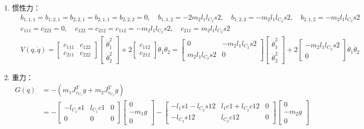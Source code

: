 \documentclass[
12pt, %
a4paper, 
oneside, %
]{scrartcl}
\begin{document}
{\begin{enumerate}
\begin{align*}
&= \begin{bmatrix} m_1l_{C_1}^2 + I_{zz1} + m_2(l_1^2 + l_{C_2}^2 + 2l_1 l_{C_2}c_2) + I_{zz2} & m_2(l_{C_2}^2 + l_1 l_{C_2}c2) + I_{zz2} \\ m_2(l_{C_2}^2 + l_1 l_{C_2}c2) + I_{zz2} & m_2 l_{C_2}^2 + I_{zz2} \end{bmatrix}
\end{align*}
\item 惯性力：
\begin{align*}
&b_{1,1,1} = b_{1,2,1} = b_{2,2,1} = b_{2,1,1} = b_{2,2,2} = 0, \quad b_{1,1,2} = -2m_2 l_1 l_{C_2}s2, \quad b_{1,2,2} = -m_2 l_1 l_{C_2}s2, \quad b_{2,1,2} = -m_2 l_1 l_{C_2}s2 \\
&c_{111} = c_{222} = 0, \quad c_{122} = c_{212} = c_{112} = -m_2 l_1 l_{C_2}s2, \quad c_{211} = m_2 l_1 l_{C_2}s2 \\
&V(q, \dot{q}) = \begin{bmatrix} c_{111} & c_{122} \\ c_{211} & c_{222} \end{bmatrix} \begin{bmatrix} \dot{\theta}_1^2 \\ \dot{\theta}_2^2 \end{bmatrix} + 2\begin{bmatrix} c_{112} \\ c_{212} \end{bmatrix} \dot{\theta}_1\dot{\theta}_2 = \begin{bmatrix} 0 & -m_2 l_1 l_{C_2}s2 \\ m_2 l_1 l_{C_2}s2 & 0 \end{bmatrix} \begin{bmatrix} \dot{\theta}_1^2 \\ \dot{\theta}_2^2 \end{bmatrix} + 2\begin{bmatrix} -m_2 l_1 l_{C_2}s2 \\ 0 \end{bmatrix} \dot{\theta}_1 \dot{\theta}_2
\end{align*}
\item 重力：
\begin{align*}
G(q) &= -(m_1 J_{v_{C_1}}^T g + m_2 J_{v_{C_2}}^T g) \\
&= -\begin{bmatrix} -l_{C_1}s1 & l_{C_1}c1 & 0 \\ 0 & 0 & 0 \end{bmatrix} \begin{bmatrix} 0 \\ -m_1 g \\ 0 \end{bmatrix} - \begin{bmatrix} -l_1 s1 - l_{C_2}s12 & l_1 c1 + l_{C_2}c12 & 0 \\ -l_{C_2}s12 & l_{C_2}c12 & 0 \end{bmatrix} \begin{bmatrix} 0 \\ -m_2 g \\ 0 \end{bmatrix} \\

\end{align*}
\end{enumerate}}
\end{document}
